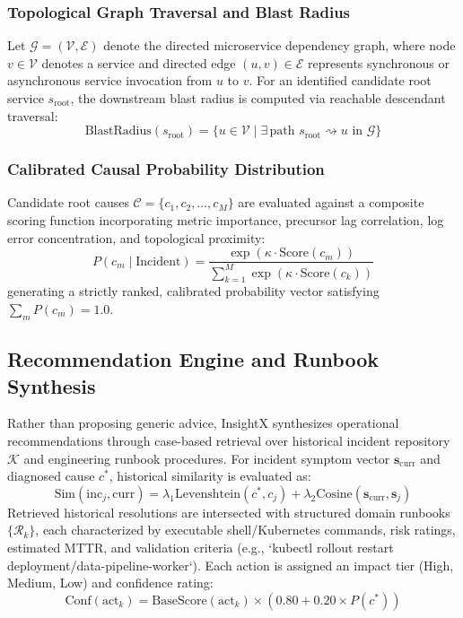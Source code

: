 \documentclass[conference]{IEEEtran}
\begin{document}
\subsubsection{Topological Graph Traversal and Blast Radius}
Let $\mathcal{G} = (\mathcal{V}, \mathcal{E})$ denote the directed microservice dependency graph, where node $v \in \mathcal{V}$ denotes a service and directed edge $(u, v) \in \mathcal{E}$ represents synchronous or asynchronous service invocation from $u$ to $v$. For an identified candidate root service $s_{\text{root}}$, the downstream blast radius is computed via reachable descendant traversal:
\begin{equation}
\text{BlastRadius}(s_{\text{root}}) = \{u \in \mathcal{V} \mid \exists\, \text{path } s_{\text{root}} \rightsquigarrow u \text{ in } \mathcal{G}\}
\end{equation}

\subsubsection{Calibrated Causal Probability Distribution}
Candidate root causes $\mathcal{C} = \{c_1, c_2, \dots, c_M\}$ are evaluated against a composite scoring function incorporating metric importance, precursor lag correlation, log error concentration, and topological proximity:
\begin{equation}
P(c_m \mid \text{Incident}) = \frac{\exp(\kappa \cdot \text{Score}(c_m))}{\sum_{k=1}^M \exp(\kappa \cdot \text{Score}(c_k))}
\end{equation}
generating a strictly ranked, calibrated probability vector satisfying $\sum_m P(c_m) = 1.0$.

\subsection{Recommendation Engine and Runbook Synthesis}
Rather than proposing generic advice, InsightX synthesizes operational recommendations through case-based retrieval over historical incident repository $\mathcal{K}$ and engineering runbook procedures. For incident symptom vector $\mathbf{s}_{\text{curr}}$ and diagnosed cause $c^*$, historical similarity is evaluated as:
\begin{equation}
\text{Sim}(\text{inc}_j, \text{curr}) = \lambda_1 \text{Levenshtein}(c^*, c_j) + \lambda_2 \text{Cosine}(\mathbf{s}_{\text{curr}}, \mathbf{s}_j)
\end{equation}
Retrieved historical resolutions are intersected with structured domain runbooks $\{\mathcal{R}_k\}$, each characterized by executable shell/Kubernetes commands, risk ratings, estimated MTTR, and validation criteria (e.g., `kubectl rollout restart deployment/data-pipeline-worker`). Each action is assigned an impact tier (High, Medium, Low) and confidence rating:
\begin{equation}
\text{Conf}(\text{act}_k) = \text{BaseScore}(\text{act}_k) \times (0.80 + 0.20 \times P(c^*))
\end{equation}
\end{document}
